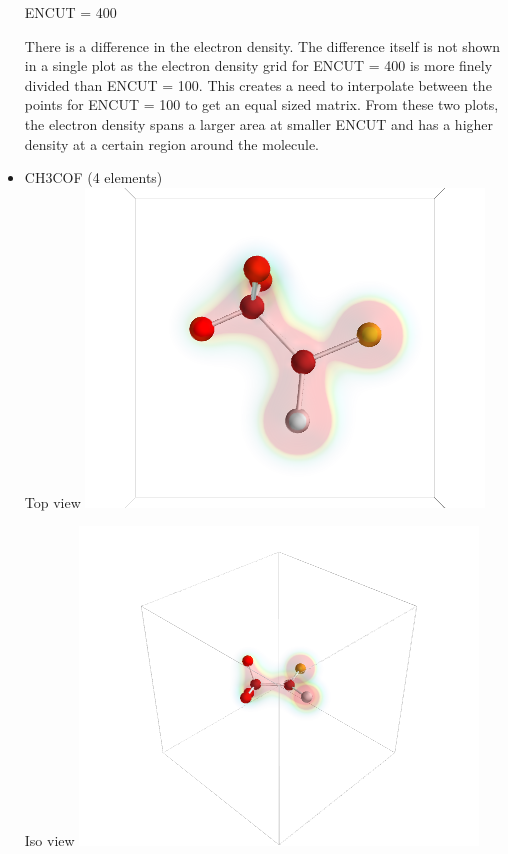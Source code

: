 \documentclass[11pt]{article}
\begin{document}
\begin{itemize}
ENCUT = 400

There is a difference in the electron density.  The difference itself is not shown in a single plot as the electron density grid for ENCUT = 400 is more finely divided than ENCUT = 100.  This creates a need to interpolate between the points for ENCUT = 100 to get an equal sized matrix.  From these two plots, the electron density spans a larger area at smaller ENCUT and has a higher density at a certain region around the molecule.


\item CH3COF (4 elements)\\
\label{sec-1-6-1-3}%
Top view
\includegraphics[width=.9\linewidth]{./images/CH3COF_top.png}

Iso view
\includegraphics[width=.9\linewidth]{./images/CH3COF_iso.png}


\end{itemize}
\end{document}
